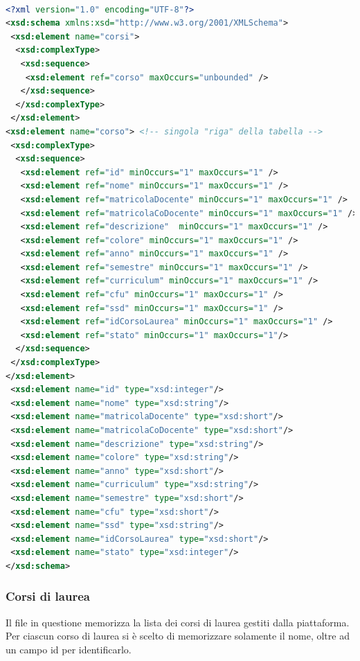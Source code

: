 \documentclass [a4paper,11pt]{book}
\begin{document}
\begin{lstlisting}[language=XML]

<?xml version="1.0" encoding="UTF-8"?>
<xsd:schema xmlns:xsd="http://www.w3.org/2001/XMLSchema">
 <xsd:element name="corsi">
  <xsd:complexType>
   <xsd:sequence>
    <xsd:element ref="corso" maxOccurs="unbounded" />
   </xsd:sequence>
  </xsd:complexType>
 </xsd:element>
<xsd:element name="corso"> <!-- singola "riga" della tabella -->
 <xsd:complexType>
  <xsd:sequence>
   <xsd:element ref="id" minOccurs="1" maxOccurs="1" /> 
   <xsd:element ref="nome" minOccurs="1" maxOccurs="1" />
   <xsd:element ref="matricolaDocente" minOccurs="1" maxOccurs="1" />
   <xsd:element ref="matricolaCoDocente" minOccurs="1" maxOccurs="1" />
   <xsd:element ref="descrizione"  minOccurs="1" maxOccurs="1" />
   <xsd:element ref="colore" minOccurs="1" maxOccurs="1" />
   <xsd:element ref="anno" minOccurs="1" maxOccurs="1" />
   <xsd:element ref="semestre" minOccurs="1" maxOccurs="1" />
   <xsd:element ref="curriculum" minOccurs="1" maxOccurs="1" />
   <xsd:element ref="cfu" minOccurs="1" maxOccurs="1" />
   <xsd:element ref="ssd" minOccurs="1" maxOccurs="1" />
   <xsd:element ref="idCorsoLaurea" minOccurs="1" maxOccurs="1" />
   <xsd:element ref="stato" minOccurs="1" maxOccurs="1"/>
  </xsd:sequence>   
 </xsd:complexType>
</xsd:element>
 <xsd:element name="id" type="xsd:integer"/>
 <xsd:element name="nome" type="xsd:string"/>
 <xsd:element name="matricolaDocente" type="xsd:short"/>
 <xsd:element name="matricolaCoDocente" type="xsd:short"/>
 <xsd:element name="descrizione" type="xsd:string"/>
 <xsd:element name="colore" type="xsd:string"/>
 <xsd:element name="anno" type="xsd:short"/>
 <xsd:element name="curriculum" type="xsd:string"/>
 <xsd:element name="semestre" type="xsd:short"/>
 <xsd:element name="cfu" type="xsd:short"/>
 <xsd:element name="ssd" type="xsd:string"/>
 <xsd:element name="idCorsoLaurea" type="xsd:short"/>
 <xsd:element name="stato" type="xsd:integer"/>
</xsd:schema>
\end{lstlisting}

\medskip

\subsubsection{Corsi di laurea}

Il file in questione memorizza la lista dei corsi di laurea gestiti dalla piattaforma. Per ciascun corso di laurea si è scelto di memorizzare solamente il nome, oltre ad un campo id per identificarlo.
\end{document}
